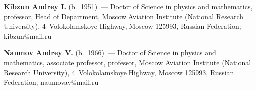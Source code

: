 \noindent
\textbf{Kibzun Andrey I.} (b.\ 1951)~--- 
Doctor of Science in physics and mathematics, professor,  
Head of Department, Moscow Aviation Institute (National Research University), 
4~Volokolamskoye Highway,
Moscow 125993, Russian Federation;  \mbox{kibzun@mail.ru} 

\vspace*{3pt}

\noindent
\textbf{Naumov Andrey V.} (b.\ 1966)~--- 
Doctor of Science in physics and mathematics, associate professor,  
professor, Moscow Aviation Institute (National Research University), 
4~Volokolamskoye Highway,
Moscow 125993, Russian Federation;  \mbox{naumovav@mail.ru} 
\label{end\stat}


\renewcommand{\bibname}{\protect\rm Литература} 